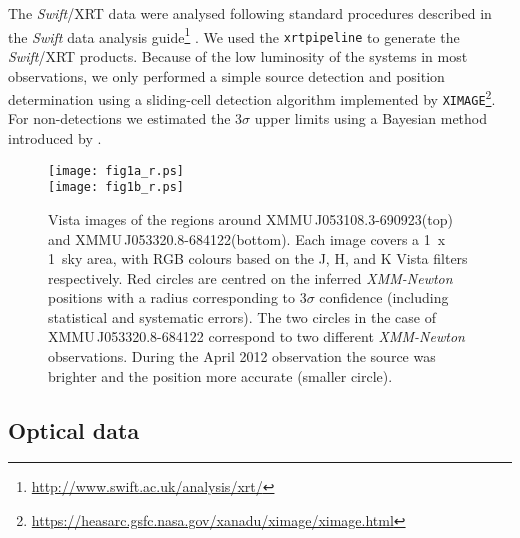 \documentclass[a4paper,fleqn,usenatbib]{mnras}
\newcommand{\swift}{{\it Swift}\xspace}
\newcommand{\xmm}{{\it XMM-Newton}\xspace}
\newcommand{\canda}{XMMU\,J053108.3-690923\xspace} %
\newcommand{\candb}{XMMU\,J053320.8-684122\xspace} %
\begin{document}
The \swift/XRT data were analysed following standard procedures described in the \swift data analysis guide\footnote{\url{http://www.swift.ac.uk/analysis/xrt/}} \citep{2007A&A...469..379E}. We used the {\tt xrtpipeline} to generate the \swift/XRT products. Because of the low luminosity of the systems in most observations, we only performed a simple source detection and position determination using a sliding-cell detection algorithm implemented by {\tt XIMAGE}\footnote{\url{https://heasarc.gsfc.nasa.gov/xanadu/ximage/ximage.html}}. 
For non-detections we estimated the 3$\sigma$ upper limits using a Bayesian method introduced by \citet{1991ApJ...374..344K}.



\begin{figure}
      \texttt{[image: fig1a\_r.ps]}\\
      \texttt{[image: fig1b\_r.ps]}
\caption{ 
Vista images of the regions around \canda (top) and \candb (bottom). Each image covers a 1\arcmin\ x 1\arcmin\ sky area, with 
RGB colours based on the J, H, and K Vista filters respectively. Red circles are centred on the inferred \xmm positions with a radius corresponding to 3$\sigma$ confidence (including statistical and systematic errors). The two circles in the case of \candb correspond to two different \xmm observations. During the April 2012 observation the source was brighter and the position more accurate (smaller circle).}
  \label{fig:finding}
\end{figure}

\subsection{Optical data}
\end{document}
